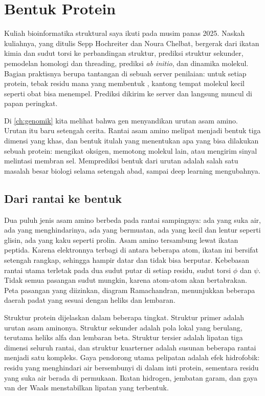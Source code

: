 \chapter{Bentuk Protein}
\label{ch:protein}

Kuliah bioinformatika struktural saya ikuti pada musim panas 2025. Naskah kuliahnya, yang ditulis Sepp Hochreiter dan
Noura Chelbat, bergerak dari ikatan kimia dan sudut torsi ke perbandingan struktur, prediksi struktur sekunder,
pemodelan homologi dan threading, prediksi \emph{ab initio}, dan dinamika molekul. Bagian praktisnya berupa tantangan di
sebuah server penilaian: untuk setiap protein, tebak residu mana yang membentuk , kantong tempat
molekul kecil seperti obat bisa menempel. Prediksi dikirim ke server dan langsung muncul di papan peringkat.

Di \cref{ch:genomik} kita melihat bahwa gen menyandikan urutan asam amino. Urutan itu baru setengah cerita. Rantai asam
amino melipat menjadi bentuk tiga dimensi yang khas, dan bentuk itulah yang menentukan apa yang bisa dilakukan sebuah
protein: mengikat oksigen, memotong molekul lain, atau mengirim sinyal melintasi membran sel. Memprediksi bentuk dari
urutan adalah salah satu masalah besar biologi selama setengah abad, sampai deep learning mengubahnya.

\section{Dari rantai ke bentuk}

Dua puluh jenis asam amino berbeda pada rantai sampingnya: ada yang suka air, ada yang menghindarinya, ada yang bermuatan,
ada yang kecil dan lentur seperti glisin, ada yang kaku seperti prolin. Asam amino tersambung lewat ikatan peptida. Karena
elektronnya terbagi di antara beberapa atom, ikatan ini bersifat setengah rangkap, sehingga hampir datar dan tidak bisa
berputar. Kebebasan rantai utama terletak pada dua sudut putar di setiap residu, sudut torsi $\phi$ dan $\psi$. Tidak
semua pasangan sudut mungkin, karena atom-atom akan bertabrakan. Peta pasangan yang diizinkan, diagram Ramachandran,
menunjukkan beberapa daerah padat yang sesuai dengan heliks dan lembaran.

Struktur protein dijelaskan dalam beberapa tingkat. Struktur primer adalah urutan asam aminonya. Struktur sekunder adalah
pola lokal yang berulang, terutama heliks alfa dan lembaran beta. Struktur tersier adalah lipatan tiga dimensi seluruh
rantai, dan struktur kuarterner adalah susunan beberapa rantai menjadi satu kompleks. Gaya pendorong utama pelipatan adalah
efek hidrofobik: residu yang menghindari air bersembunyi di dalam inti protein, sementara residu yang suka air berada di
permukaan. Ikatan hidrogen, jembatan garam, dan gaya van der Waals menstabilkan lipatan yang terbentuk.

